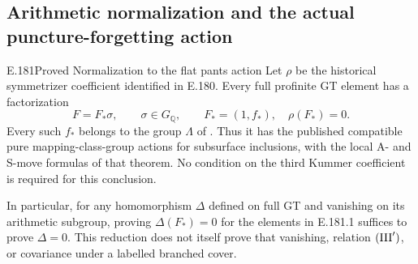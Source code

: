 \subsection{Arithmetic normalization and the actual puncture-forgetting action}

\begin{result}{E.181}{Proved}
{Normalization to the flat pants action}
Let \(\rho\) be the historical symmetrizer coefficient identified
in E.180.  Every full profinite GT element has a factorization
\[
 F=F_*\sigma,\qquad \sigma\in G_{\mathbb Q},\qquad
 F_*=(1,f_*),\quad \rho(F_*)=0.
\tag{E.181.1}
\]
Every such \(f_*\) belongs to the group \(\Lambda\) of
\citet[\S1, p.4; Theorems 4--5, pp.18--23]
{LitHatcherLochakSchneps2000}.
Thus it has the published compatible pure mapping-class-group
actions for subsurface inclusions, with the local A- and S-move
formulas of that theorem.  No condition on the third Kummer
coefficient is required for this conclusion.

In particular, for any homomorphism \(\Delta\) defined on full GT
and vanishing on its arithmetic subgroup, proving
\(\Delta(F_*)=0\) for the elements in E.181.1 suffices to prove
\(\Delta=0\).  This reduction does not itself prove that vanishing,
relation \(({\rm III}')\), or covariance under a labelled branched
cover.
\end{result}


